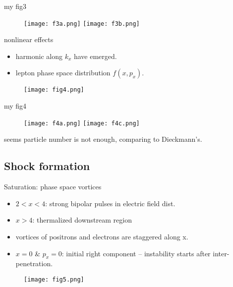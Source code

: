 \documentclass[10pt]{beamer}
\begin{document}
\begin{frame}[fragile]{my fig3}
\begin{figure}
  \texttt{[image: f3a.png]}
  \texttt{[image: f3b.png]}
\end{figure}


\end{frame}

\begin{frame}{nonlinear effects}
  \begin{itemize}
  \item harmonic along $k_x$ have emerged.
  \item lepton phase space distribution $f(x,p_x)$.
  \end{itemize}

  \begin{figure}
    \texttt{[image: fig4.png]}
  \end{figure}
\end{frame}

\begin{frame}{my fig4}
\begin{figure}
    \texttt{[image: f4a.png]}
    \texttt{[image: f4c.png]}
  \end{figure}
  
  seems particle number is not enough, comparing to Dieckmann's.
\end{frame}

\subsection{Shock formation}


\begin{frame}{Saturation: phase space vortices}
  \begin{itemize}
  \item $2<x<4$: strong bipolar pulses in electric field dist.
  \item $x>4$: thermalized downstream region
  \item vortices of positrons and electrons are staggered along x.
  \item $x=0$ \& $p_x=0$: initial right component -- instability starts after inter-penetration.
  \end{itemize}
  \begin{figure}
    \texttt{[image: fig5.png]}
  \end{figure}
\end{frame}
\end{document}
